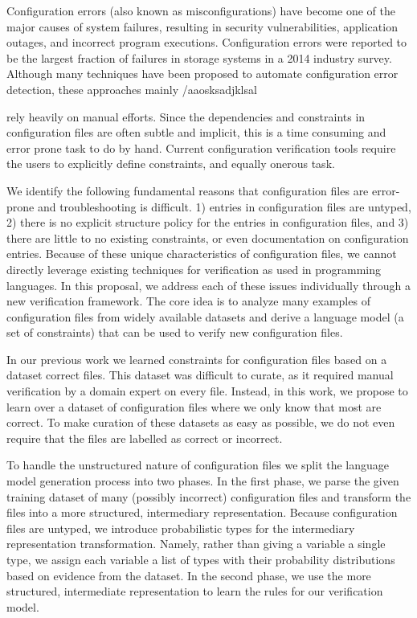 Configuration errors (also known as misconfigurations) have become one of the major causes of system failures, resulting in security vulnerabilities, application outages, and incorrect program executions. 
Configuration errors were reported to be the largest fraction of failures in storage systems in a 2014 industry survey. Although many techniques have been proposed to automate configuration error detection, these approaches mainly /aaosksadjklsal

rely heavily on manual efforts. 
Since the dependencies and constraints in configuration files are often subtle and implicit, this is a time consuming and error prone task to do by hand.
Current configuration verification tools require the users to explicitly define constraints, and equally onerous task.



We identify the following fundamental reasons that configuration files are error-prone and troubleshooting is difficult. 
  1) entries in configuration files are untyped, 
  2) there is no explicit structure policy for the entries in configuration files, and 
  3) there are little to no existing constraints, or even documentation on configuration entries.
Because of these unique characteristics of configuration files, we cannot directly leverage existing techniques for verification as used in programming languages. 
In this proposal, we address each of these issues individually through a new verification framework.
The core idea is to analyze many examples of configuration files from widely available datasets and derive a language model (a set of constraints) that can be used to verify new configuration files.

In our previous work we learned constraints for configuration files based on a dataset correct files.
This dataset was difficult to curate, as it required manual verification by a domain expert on every file.
Instead, in this work, we propose to learn over a dataset of configuration files where we only know that most are correct.
To make curation of these datasets as easy as possible, we do not even require that the files are labelled as correct or incorrect.

To handle the unstructured nature of configuration files we split the language model generation process into two phases. 
In the first phase, we parse the given training dataset of many (possibly incorrect) configuration files and transform the files into a more structured, intermediary representation. 
Because configuration files are untyped, we introduce probabilistic types for the intermediary representation transformation. 
Namely, rather than giving a variable a single type, we assign each variable a list of types with their probability distributions based on evidence from the dataset. 
In the second phase, we use the more structured, intermediate representation to learn the rules for our verification model. 

